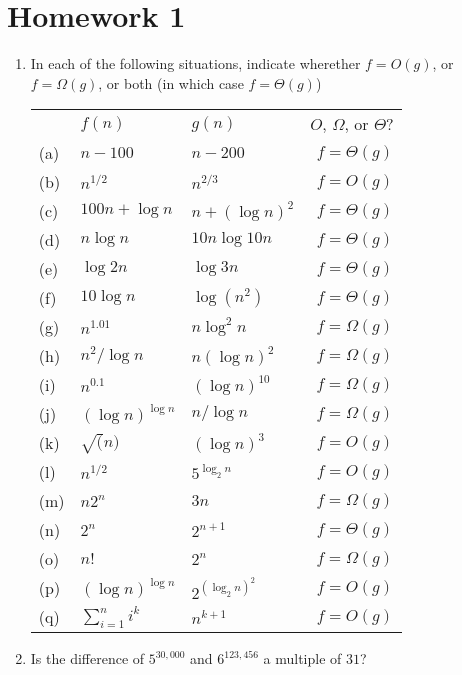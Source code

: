 \documentclass[a4paper,12pt]{article}
\begin{document}
\section*{Homework 1}

\begin{enumerate}
    \item In each of the following situations, indicate wherether $f = O(g)$, or $f = \Omega(g)$, or both (in which case $f = \Theta(g)$)

    \begin{tabular}{lll|r}
      ~ & $f(n)$ & $g(n)$ & $O$, $\Omega$, or $\Theta$?\\
      (a) & $n - 100$ & $n - 200$ & $f = \Theta(g)$ \\
      (b) & $n^{1/2}$ & $n^{2/3}$ & $f = O(g)$\\
      (c) & $100n + \log n$ & $n + (\log n)^2$& $f = \Theta(g)$ \\
      (d) & $n \log n $ & $10n \log 10n$ & $f = \Theta(g)$\\
      (e) & $\log 2n$ & $\log 3n$ & $f = \Theta(g)$ \\
      (f) & $10 \log n$ & $\log(n^2)$ & $f = \Theta(g)$ \\
      (g) & $n^{1.01}$ & $n \log^2 n$ & $f = \Omega(g)$\\
      (h) & $n^2 / \log n$ & $n(\log n)^2$ & $f = \Omega(g)$\\
      (i) & $n^{0.1}$ & $(\log n)^{10}$ & $f = \Omega(g)$\\
      (j) & $(\log n)^{\log n}$ & $n / \log n$ & $f = \Omega(g)$\\
      (k) & $\sqrt(n)$ & $(\log n)^3$ & $f = O(g)$\\
      (l) & $n^{1/2}$ & $5^{\log_2 n}$ & $f = O(g)$\\
      (m) & $n2^n$ & $3n$ & $f = \Omega(g)$\\
      (n) & $2^n$ & $2^{n+1}$ & $f = \Theta(g)$ \\
      (o) & $n!$ & $2^n$ & $f = \Omega(g)$ \\
      (p) & $(\log n)^{\log n}$ & $2^{(\log_2 n)^2}$ & $f = O(g)$ \\
      (q) & $\sum_{i = 1}^n i^k$ & $n^{k+1}$ & $f = O(g)$\\
    \end{tabular}
    \item Is the difference of $5^{30,000}$ and $6^{123,456}$ a multiple of $31$?
    \\\\
    
\end{enumerate}
\end{document}
